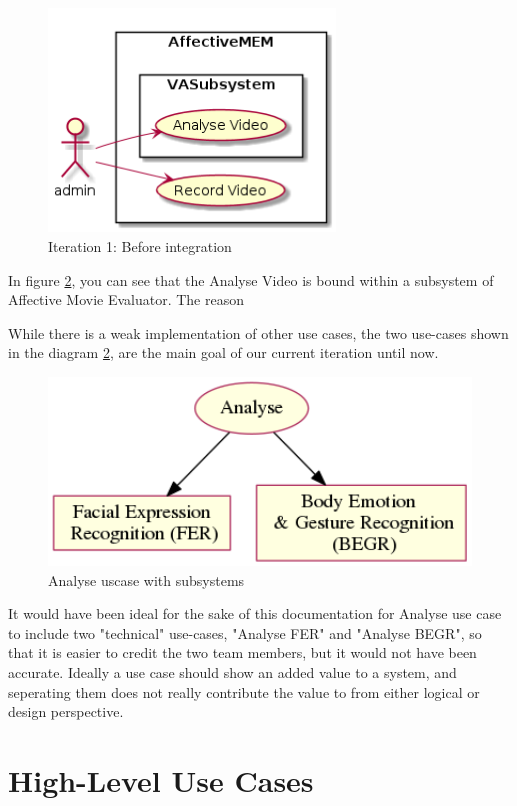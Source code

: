 \documentclass[12pt,a4paper,man]{report}
\begin{document}
\begin{figure}[htbp]
\centering
\includegraphics[width=3in]{./img/auc.png}
\caption{\label{fig:auc}
Iteration 1: Before integration}
\end{figure}


In figure \ref{fig:auc}, you can see that the Analyse Video is bound within a subsystem of Affective Movie Evaluator. The reason

While there is a weak implementation of other use cases, the two use-cases shown in the diagram \ref{fig:auc}, are the main goal of our current iteration until now.

\begin{figure}[htbp]
\centering
\includegraphics[width=5in]{./img/auc_exp.png}
\caption{\label{fig:auc}
Analyse uscase with subsystems}
\end{figure}


It would have been ideal for the sake of this documentation for Analyse use case to include two "technical" use-cases, "Analyse FER" and "Analyse BEGR", so that it is easier to credit the two team members, but it would not have been accurate. Ideally a use case should show an added value to a system, and seperating them does not really contribute the value to from either logical or design perspective. 

\section{High-Level Use Cases}
\label{sec:org6baa349}
\end{document}
